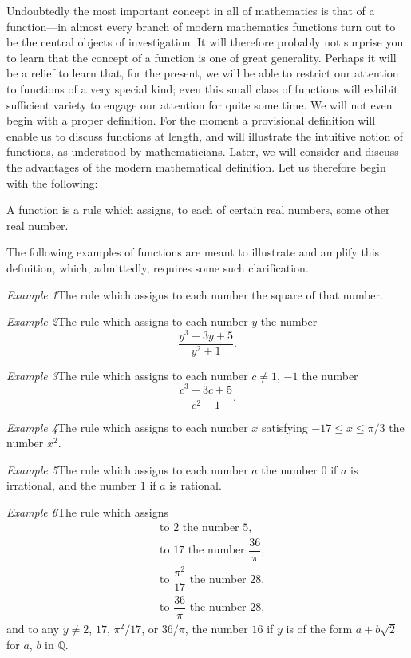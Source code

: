 

Undoubtedly the most important concept in all of mathematics is that of a
function---in almost every branch of modern mathematics functions turn out to
be the central objects of investigation. It will therefore probably not surprise
you to learn that the concept of a function is one of great generality. Perhaps
it will be a relief to learn that, for the present, we will be able to restrict our
attention to functions of a very special kind; even this small class of functions
will exhibit sufficient variety to engage our attention for quite some time. We
will not even begin with a proper definition. For the moment a provisional
definition will enable us to discuss functions at length, and will illustrate the
intuitive notion of functions, as understood by mathematicians. Later, we will
consider and discuss the advantages of the modern mathematical definition.
Let us therefore begin with the following:

\begin{spivakdefn}
A function is a rule which assigns, to each of certain real numbers, some other
real number.
\end{spivakdefn}

The following examples of functions are meant to illustrate and amplify this
definition, which, admittedly, requires some such clarification.

\textit{Example 1}\quad The rule which assigns to each number the square of that
number.

\textit{Example 2}\quad The rule which assigns to each number $y$ the number
\[
\frac{y^3 + 3y + 5}{y^2 + 1}.
\]

\textit{Example 3}\quad The rule which assigns to each number $c \neq 1$, $-1$ the
number
\[
\frac{c^3 + 3c + 5}{c^2 - 1}.
\]

\textit{Example 4}\quad The rule which assigns to each number $x$ satisfying
$-17 \leq x \leq \pi/3$ the number $x^2$.

\textit{Example 5}\quad The rule which assigns to each number $a$ the number $0$
if $a$ is irrational, and the number $1$ if $a$ is rational.

\textit{Example 6}\quad The rule which assigns
\begin{align*}
&\text{to $2$ the number $5$,}\\
&\text{to $17$ the number $\dfrac{36}{\pi}$,}\\
&\text{to $\dfrac{\pi^2}{17}$ the number $28$,}\\
&\text{to $\dfrac{36}{\pi}$ the number $28$,}
\end{align*}
and to any $y \neq 2$, $17$, $\pi^2/17$, or $36/\pi$, the number $16$ if $y$ is of
the form $a + b\sqrt{2}$ for $a$, $b$ in $\mathbb{Q}$.


